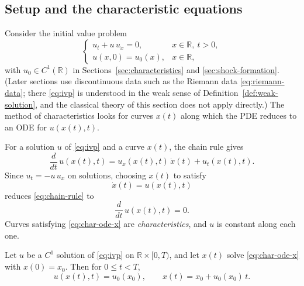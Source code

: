 \subsection{Setup and the characteristic equations}
\label{subsec:char-setup}

Consider the initial value problem
\begin{equation}
  \label{eq:ivp}
  \begin{cases}
    u_t + u\, u_x = 0, & x \in \mathbb{R},\ t > 0, \\
    u(x,0) = u_0(x), & x \in \mathbb{R},
  \end{cases}
\end{equation}
with $u_0 \in C^1(\mathbb{R})$ in Sections~\ref{sec:characteristics} and
\ref{sec:shock-formation}. (Later sections use discontinuous data such as
the Riemann data \eqref{eq:riemann-data}; there \eqref{eq:ivp} is
understood in the weak sense of Definition~\ref{def:weak-solution}, and
the classical theory of this section does not apply directly.) The method
of characteristics looks for curves $x(t)$ along which the PDE reduces to
an ODE for $u(x(t),t)$.

For a solution $u$ of \eqref{eq:ivp} and a curve $x(t)$, the chain rule
gives
\begin{equation}
  \label{eq:chain-rule}
  \frac{d}{dt}\, u(x(t), t) = u_x(x(t),t)\, \dot{x}(t) + u_t(x(t),t).
\end{equation}
Since $u_t = -u\,u_x$ on solutions, choosing $x(t)$ to satisfy
\begin{equation}
  \label{eq:char-ode-x}
  \dot{x}(t) = u(x(t), t)
\end{equation}
reduces \eqref{eq:chain-rule} to
\begin{equation}
  \label{eq:char-ode-u}
  \frac{d}{dt}\, u(x(t), t) = 0.
\end{equation}
Curves satisfying \eqref{eq:char-ode-x} are \emph{characteristics}, and
$u$ is constant along each one.

\begin{proposition}
\label{prop:char-lines}
Let $u$ be a $C^1$ solution of \eqref{eq:ivp} on $\mathbb{R} \times
[0,T)$, and let $x(t)$ solve \eqref{eq:char-ode-x} with $x(0)=x_0$. Then
for $0 \le t < T$,
\begin{equation}
  \label{eq:char-formula}
  u(x(t), t) = u_0(x_0), \qquad x(t) = x_0 + u_0(x_0)\, t.
\end{equation}
\end{proposition}

